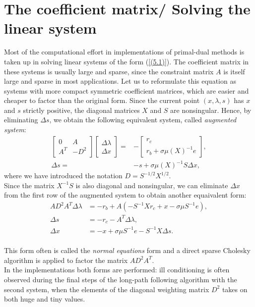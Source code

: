 \documentclass[a4paper,10 pt,titlepage,twoside]{book}
\theoremstyle{plain}
\theoremstyle{definition}
\theoremstyle{remark}
\begin{document}
\section*{The coefficient matrix/ Solving the linear system}
Most of the computational effort in implementations of primal-dual methods is taken up in solving linear systems of the form (\ref{(5.1)}). The
coefficient matrix in these systems is usually large and sparse, since the constraint
matrix $A$ is itself large and sparse in most applications. Let us to reformulate
this equation as systems with more compact symmetric coefficient matrices, which
are easier and cheaper to factor than the original form. Since the current point $(x, \lambda, s)$ has $x$ and $s$ strictly
positive, the diagonal matrices $X$ and $S$ are nonsingular. Hence, by eliminating $\Delta s$, we obtain the following equivalent system, called \textit{augmented system}:
\begin{align*}
\begin{bmatrix}
0&A\\A^{T}&-D^{2}
\end{bmatrix}\begin{bmatrix}
\Delta\lambda \\\Delta x
\end{bmatrix}=&-\begin{bmatrix}
r_{c}\\r_{b} + \sigma\mu(X)^{-1}e
\end{bmatrix},\\
\Delta s =& -s +\sigma\mu (X)^{-1}S\Delta x,
\end{align*}
where we have introduced the notation $D = S^{-1/2}X^{1/2}$.\\
Since the matrix $X^{-1}S$ is also diagonal and nonsingular, we can eliminate $\Delta x$ from the first row of the augmented system to obtain another equaivalent form:
\begin{align*}
AD^{2}A^{T}\Delta\lambda &= -r_{b}+A(-S^{-1}Xr_{c}+ x - \sigma\mu S^{-1}e),\\
\Delta s &= -r_{c}-A^{T}\Delta \lambda,\\
\Delta x &= -x + \sigma \mu S^{-1}e-S^{-1}X\Delta s.
\end{align*}
\\
This form often is called the \textit{normal equations} form and a direct sparse Cholesky algorithm is applied to factor the matrix $AD^{2}A^{T}$. \\In the implementations both forms are performed: ill conditioning is often observed during the final
steps of the long-path following algorithm with the second system, when the elements of the diagonal weighting
matrix $D^{2}$ takes on both huge and tiny values.
\end{document}
